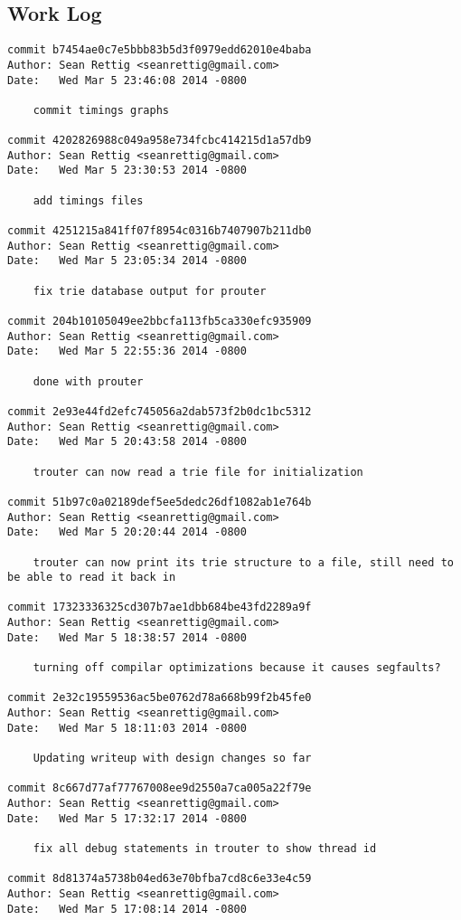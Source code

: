 \documentclass[letterpaper,10pt,fleqn]{article}
\numberwithin{equation}{section}
\begin{document}
\subsection*{Work Log}
\begin{verbatim}
commit b7454ae0c7e5bbb83b5d3f0979edd62010e4baba
Author: Sean Rettig <seanrettig@gmail.com>
Date:   Wed Mar 5 23:46:08 2014 -0800

    commit timings graphs

commit 4202826988c049a958e734fcbc414215d1a57db9
Author: Sean Rettig <seanrettig@gmail.com>
Date:   Wed Mar 5 23:30:53 2014 -0800

    add timings files

commit 4251215a841ff07f8954c0316b7407907b211db0
Author: Sean Rettig <seanrettig@gmail.com>
Date:   Wed Mar 5 23:05:34 2014 -0800

    fix trie database output for prouter

commit 204b10105049ee2bbcfa113fb5ca330efc935909
Author: Sean Rettig <seanrettig@gmail.com>
Date:   Wed Mar 5 22:55:36 2014 -0800

    done with prouter

commit 2e93e44fd2efc745056a2dab573f2b0dc1bc5312
Author: Sean Rettig <seanrettig@gmail.com>
Date:   Wed Mar 5 20:43:58 2014 -0800

    trouter can now read a trie file for initialization

commit 51b97c0a02189def5ee5dedc26df1082ab1e764b
Author: Sean Rettig <seanrettig@gmail.com>
Date:   Wed Mar 5 20:20:44 2014 -0800

    trouter can now print its trie structure to a file, still need to be able to read it back in

commit 17323336325cd307b7ae1dbb684be43fd2289a9f
Author: Sean Rettig <seanrettig@gmail.com>
Date:   Wed Mar 5 18:38:57 2014 -0800

    turning off compilar optimizations because it causes segfaults?

commit 2e32c19559536ac5be0762d78a668b99f2b45fe0
Author: Sean Rettig <seanrettig@gmail.com>
Date:   Wed Mar 5 18:11:03 2014 -0800

    Updating writeup with design changes so far

commit 8c667d77af77767008ee9d2550a7ca005a22f79e
Author: Sean Rettig <seanrettig@gmail.com>
Date:   Wed Mar 5 17:32:17 2014 -0800

    fix all debug statements in trouter to show thread id

commit 8d81374a5738b04ed63e70bfba7cd8c6e33e4c59
Author: Sean Rettig <seanrettig@gmail.com>
Date:   Wed Mar 5 17:08:14 2014 -0800


\end{verbatim}
\end{document}
